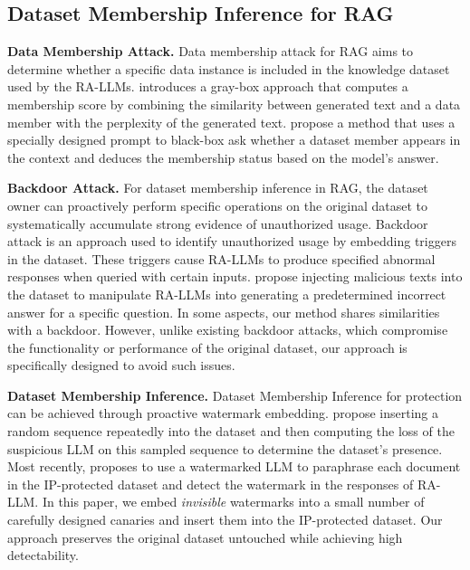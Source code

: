\vspace{-0.5em}

\subsection{Dataset Membership Inference for RAG} 
\vspace{-0.5em}
\textbf{Data Membership Attack.} Data membership attack for RAG \cite{liu2024mask} aims to determine whether a specific data instance is included in the knowledge dataset used by the RA-LLMs. \citet{li2024seeing} introduces a gray-box approach that computes a membership score by combining the similarity between generated text and a data member with the perplexity of the generated text. \citet{anderson2024my} propose a method that uses a specially designed prompt to black-box ask whether a dataset member appears in the context and deduces the membership status based on the model's answer.

\textbf{Backdoor Attack.} For dataset membership inference in RAG, the dataset owner can proactively perform specific operations on the original dataset to systematically accumulate strong evidence of unauthorized usage. Backdoor attack \cite{chaudhari2024phantom, cheng2024trojanrag, chen2024agentpoison} is an approach used to identify unauthorized usage by embedding triggers in the dataset. These triggers cause RA-LLMs to produce specified abnormal responses when queried with certain inputs. \citet{zou2024poisonedrag} propose injecting malicious texts into the dataset to manipulate RA-LLMs into generating a predetermined incorrect answer for a specific question. In some aspects, our method shares similarities with a backdoor. However, unlike existing backdoor attacks, which compromise the functionality or performance of the original dataset, our approach is specifically designed to avoid such issues.


\textbf{Dataset Membership Inference.} 
Dataset Membership Inference for protection can be achieved through proactive watermark embedding.
\citet{wei2024proving} propose inserting a random sequence repeatedly into the dataset and then computing the loss of the suspicious LLM on this sampled sequence to determine the dataset's presence. Most recently, \citet{jovanovic2024ward} proposes to use a watermarked LLM to paraphrase each document in the IP-protected dataset and detect the watermark in the responses of RA-LLM. In this paper, we embed \emph{invisible} watermarks into a small number of carefully designed canaries and insert them into the IP-protected dataset. Our approach preserves the original dataset untouched while achieving high detectability.



